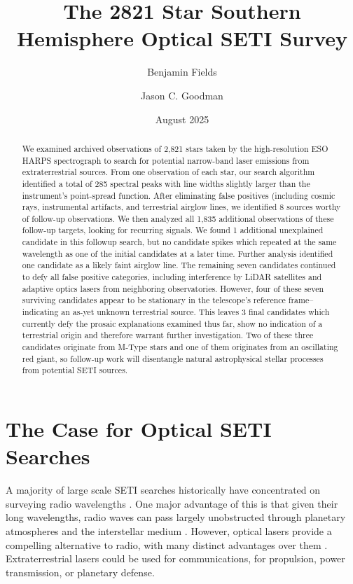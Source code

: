 \documentclass[twocolumn]{aastex701}
\begin{document}
\title{The 2821 Star Southern Hemisphere Optical SETI Survey}
\author[0009-0008-7048-916X]{Benjamin Fields} %

\author[0000-0002-6755-2710]{Jason C. Goodman}

\date{August 2025}

\begin{abstract}
We examined archived observations of 2,821 stars taken by the high-resolution ESO HARPS spectrograph to search for potential narrow-band laser emissions from extraterrestrial sources. From one observation of each star, our search algorithm identified a total of 285 spectral peaks with line widths slightly larger than the instrument's point-spread function.  After eliminating  false positives (including cosmic rays, instrumental artifacts, and terrestrial airglow lines, we identified 8 sources worthy of follow-up observations. We then analyzed all 1,835 additional observations of these follow-up targets, looking for recurring signals. We found 1 additional unexplained candidate in this followup search, but no candidate spikes which repeated at the same wavelength as one of the initial candidates at a later time.  Further analysis identified one candidate as a likely faint airglow line. The remaining seven candidates continued to defy all false positive categories, including interference by LiDAR satellites and adaptive optics lasers from neighboring observatories. However, four of these seven surviving candidates appear to be stationary in the telescope's reference frame--indicating an as-yet unknown terrestrial source. This leaves 3 final candidates which currently defy the prosaic explanations examined thus far, show no indication of a terrestrial origin and therefore warrant further investigation. Two of these three candidates originate from M-Type stars and one of them originates from an oscillating red giant, so follow-up work will disentangle natural astrophysical stellar processes from potential SETI sources.
\end{abstract}

\section{The Case for Optical SETI Searches}
A majority of large scale SETI searches historically have concentrated on surveying radio wavelengths \citep{Gray_2017,OZMAII,LAMPTON1992189,Price_2020,PeterMa,Wright_2018}. One major advantage of this is that given their long wavelengths, radio waves can pass largely unobstructed through planetary atmospheres and the interstellar medium \citep{COCCONI_MORRISON_1959}. However, optical lasers provide a compelling alternative to radio, with many distinct advantages over them \citep{caseforopticalseti}. Extraterrestrial lasers could be used for communications, for propulsion, power transmission, or planetary defense.  
\end{document}
